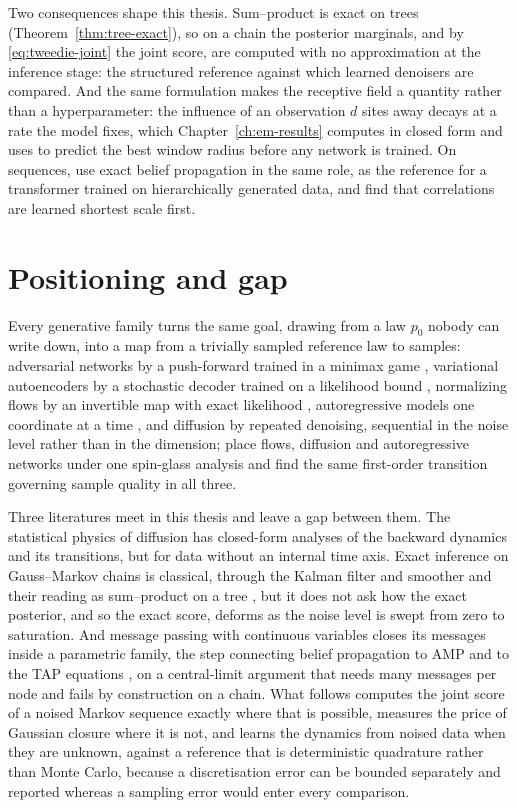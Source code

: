 Two consequences shape this thesis. Sum--product is exact on trees
(Theorem~\ref{thm:tree-exact}), so on a chain the posterior marginals, and by
\eqref{eq:tweedie-joint} the joint score, are computed with no approximation
at the inference stage: the structured reference against which learned
denoisers are compared. And the same formulation makes the receptive field a
quantity rather than a hyperparameter: the influence of an observation $d$
sites away decays at a rate the model fixes, which Chapter~\ref{ch:em-results}
computes in closed form and uses to predict the best window radius before any
network is trained. On sequences, \citet{garnierbrun2024transformers} use
exact belief propagation in the same role, as the reference for a
transformer trained on hierarchically generated data, and find that
correlations are learned shortest scale first.

\section{Positioning and gap}
\label{sec:sm-taxonomy}

Every generative family turns the same goal, drawing from a law $p_0$ nobody
can write down, into a map from a trivially sampled reference law to samples:
adversarial networks by a push-forward trained in a minimax game
\citep{goodfellow2014generative}, variational autoencoders by a stochastic
decoder trained on a likelihood bound \citep{kingma2014auto}, normalizing
flows by an invertible map with exact likelihood
\citep{papamakarios2021normalizing}, autoregressive models one coordinate at
a time \citep{vaswani2017attention}, and diffusion by repeated denoising,
sequential in the noise level rather than in the dimension;
\citet{ghio2024sampling} place flows, diffusion and autoregressive networks
under one spin-glass analysis and find the same first-order transition
governing sample quality in all three.

Three literatures meet in this thesis and leave a gap between them. The
statistical physics of diffusion has closed-form analyses of the backward
dynamics and its transitions, but for data without an internal time axis.
Exact inference on Gauss--Markov chains is classical, through the Kalman
filter and smoother and their reading as sum--product on a tree
\citep{kalman1960new, rauch1965maximum, pearl1988probabilistic,
kschischang2001factor, mezard2009information}, but it does not ask how the
exact posterior, and so the exact score, deforms as the noise level is swept
from zero to saturation. And message passing with continuous variables closes
its messages inside a parametric family, the step connecting belief
propagation to AMP and to the TAP equations \citep{thouless1977solution,
donoho2009message, zdeborova2016statistical}, on a central-limit argument that
needs many messages per node and fails by construction on a chain. What
follows computes the joint score of a noised Markov sequence exactly where
that is possible, measures the price of Gaussian closure where it is not,
and learns the dynamics from noised data when they are unknown, against a
reference that is deterministic quadrature rather than Monte Carlo, because a
discretisation error can be bounded separately and reported whereas a
sampling error would enter every comparison.
